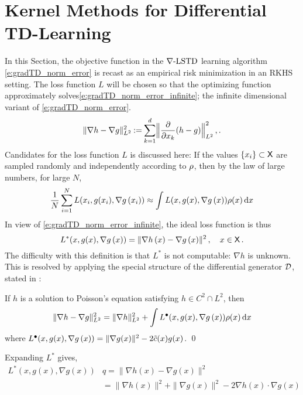 \section{Kernel Methods for Differential TD-Learning}
\label{s:kernel_choices}
In this Section, the objective function in the $\nabla\text{-LSTD}$ learning algorithm \eqref{e:gradTD_norm_error} is recast as an empirical risk minimization in an RKHS setting. The   loss function $L$ will be chosen so that the optimizing function approximately solves\eqref{e:gradTD_norm_error_infinite}; the infinite dimensional variant of \eqref{e:gradTD_norm_error}. 
\begin{equation}
\| \nabla h -  \nabla g \|^2_{L^2}   \eqdef \sum_{k=1}^d    \Bigl\|  \frac{\partial}{\partial x_k} (h-g)  \Bigr\|^2_{L^2}
\, , .
\label{e:gradTD_norm_error_infinite}
\end{equation}
Candidates for the loss function $L$ is discussed here:
If the values $\{x_i\} \subset {\sf X} $  are sampled randomly and independently according to $\rho$,  then by the law of large numbers, for large $N$,
\[
\frac{1}{N} \sum_{i=1}^N L(x_i, g(x_i), \nabla g\, (x_i))  \approx
\int  L(x, g(x), \nabla g\, (x))  \rho(x)\, \text{d} x
\]
In view of \eqref{e:gradTD_norm_error_infinite}, the ideal loss function is thus
\begin{equation}
L^*(x,g(x) ,\nabla g \,(x))  =         \| \nabla h\,(x)  -\nabla g\, (x) \|^2\,, \quad x\in\state\,.
\label{e:IdealLoss}
\end{equation}
The difficulty with this definition is that $L^*$ is not computable:  $\nabla h$ is unknown. This is resolved by applying the special structure of the differential generator ${\cal D}$,  stated in :
\begin{proposition}
	\label{prop:gradTD_erm_loss}
	If $h$ is a solution to Poisson's equation satisfying $h\in C^2\cap L^2$, then
	\[
	\| \nabla h -  \nabla g\|^2_{L^2} =\| \nabla h  \|^2_{L^2} + \int   L^\bullet(x, g(x), \nabla g\, (x)) \rho(x)\, \text{d} x
	\]
	where
	$ L^\bullet(x, g(x), \nabla g\, (x)) =   \| \nabla g(x)\|^2   - 2 \tilde c(x) g(x)$.
	\qed
\end{proposition}
Expanding $L^*$ gives,	
\[
\begin{aligned}
L^*(x,g(x),\nabla g(x)) & q = \| \nabla h(x) - \nabla g(x) \|^2 \\
& = \| \nabla h(x) \|^2 + \| \nabla g(x) \|^2- 2 \nabla h(x) \cdot \nabla g(x) \\
\end{aligned}
\]
